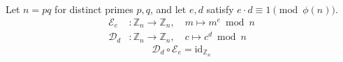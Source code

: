 \documentclass[aspectratio=169]{beamer}
\begin{document}
\begin{wallpaperframe}
Let $n = pq$ for distinct primes $p, q$, and let $e, d$ satisfy $e \cdot d \equiv 1 \pmod{\phi(n)}$.
\begin{align*}
\mathcal{E}_e &: \mathbb{Z}_n \to \mathbb{Z}_n, \quad m \mapsto m^e \bmod n \\
\mathcal{D}_d &: \mathbb{Z}_n \to \mathbb{Z}_n, \quad c \mapsto c^d \bmod n
\end{align*}
\[
\mathcal{D}_d \circ \mathcal{E}_e = \mathrm{id}_{\mathbb{Z}_n}
\]
\end{wallpaperframe}
\end{document}
